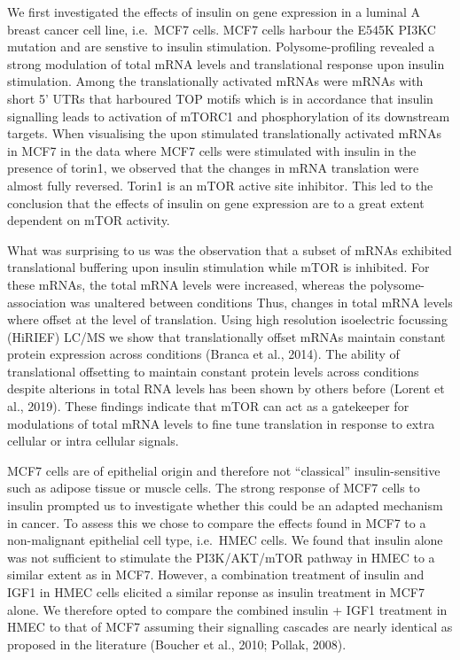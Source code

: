\documentclass[12pt,openany]{book}
\begin{document}
We first investigated the effects of insulin on gene expression in a
luminal A breast cancer cell line, i.e.~MCF7 cells. MCF7 cells harbour
the E545K PI3KC mutation and are senstive to insulin stimulation.
Polysome-profiling revealed a strong modulation of total mRNA levels and
translational response upon insulin stimulation. Among the
translationally activated mRNAs were mRNAs with short 5' UTRs that
harboured TOP motifs which is in accordance that insulin signalling
leads to activation of mTORC1 and phosphorylation of its downstream
targets. When visualising the upon stimulated translationally activated
mRNAs in MCF7 in the data where MCF7 cells were stimulated with insulin
in the presence of torin1, we observed that the changes in mRNA
translation were almost fully reversed. Torin1 is an mTOR active site
inhibitor. This led to the conclusion that the effects of insulin on
gene expression are to a great extent dependent on mTOR activity.

What was surprising to us was the observation that a subset of mRNAs
exhibited translational buffering upon insulin stimulation while mTOR is
inhibited. For these mRNAs, the total mRNA levels were increased,
whereas the polysome-association was unaltered between conditions Thus,
changes in total mRNA levels where offset at the level of translation.
Using high resolution isoelectric focussing (HiRIEF) LC/MS we show that
translationally offset mRNAs maintain constant protein expression across
conditions (Branca et al., 2014). The ability of translational
offsetting to maintain constant protein levels across conditions despite
alterions in total RNA levels has been shown by others before (Lorent et
al., 2019). These findings indicate that mTOR can act as a gatekeeper
for modulations of total mRNA levels to fine tune translation in
response to extra cellular or intra cellular signals.

MCF7 cells are of epithelial origin and therefore not ``classical''
insulin-sensitive such as adipose tissue or muscle cells. The strong
response of MCF7 cells to insulin prompted us to investigate whether
this could be an adapted mechanism in cancer. To assess this we chose to
compare the effects found in MCF7 to a non-malignant epithelial cell
type, i.e.~HMEC cells. We found that insulin alone was not sufficient to
stimulate the PI3K/AKT/mTOR pathway in HMEC to a similar extent as in
MCF7. However, a combination treatment of insulin and IGF1 in HMEC cells
elicited a similar reponse as insulin treatment in MCF7 alone. We
therefore opted to compare the combined insulin + IGF1 treatment in HMEC
to that of MCF7 assuming their signalling cascades are nearly identical
as proposed in the literature (Boucher et al., 2010; Pollak, 2008).
\end{document}
